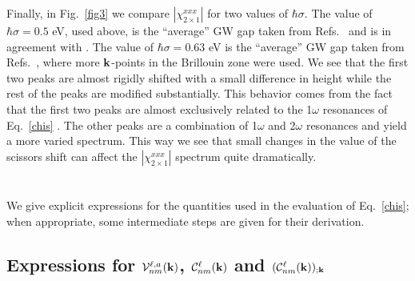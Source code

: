\documentclass[floatfix,prb,aps,superscriptaddress,11pt,preprint,letterpaper]{revtex4}
\def\chon{red}
\begin{document}
Finally, in Fig.~\ref{fig3} we compare 
$|\chi^{xxx}_{2\times 1}|$ for two values of $\hbar\sigma$. 
{\color{\chon} The} value of $\hbar\sigma=0.5$ eV, used above, 
is the ``average'' GW gap taken from 
Refs.~ 
{\color{\chon} and} is in agreement with . 
{\color{\chon} The} value of $\hbar\sigma=0.63$ eV is the ``average'' 
GW gap taken from Refs.~, 
where more {\color{\chon}$\mathbf{k}$-points} in the Brillouin zone were used.
We see that the {\color{\chon} first} two peaks are almost rigidly 
shifted with a small difference in {\color{\chon} height while} 
the rest of the peaks are modified substantially. 
This {\color{\chon} behavior comes} from the fact that the first two
peaks are {\color{\chon} almost exclusively related} to the 
1$\omega$ resonances of
Eq.~\eqref{chis}{\color{\chon} . The} other peaks are a combination 
of 1$\omega$ and 2$\omega$ resonances 
{\color{\chon} and yield a more varied} spectrum. 
This way we see that small changes in the value of the 
scissors shift can affect the
$|\chi^{xxx}_{2\times 1}|$ {\color{\chon} spectrum} quite dramatically.


\appendix 
\section{}\label{appe}
We give explicit expressions for the quantities used in the evaluation 
of Eq.~\eqref{chis}; when appropriate, some 
intermediate steps are given for their derivation. 
\subsection{ Expressions for 
\texorpdfstring{${\cal V}^{\ell,a}_{nm}(\mathbf{k})$, 
${\cal C}^{\ell}_{nm}(\mathbf{k})$ 
and
$({\cal C}^{\ell}_{nm}(\mathbf{k}))_{;\mathbf{k}}$
}{Vnm and Cnm}}\label{calpcalc}
\end{document}
